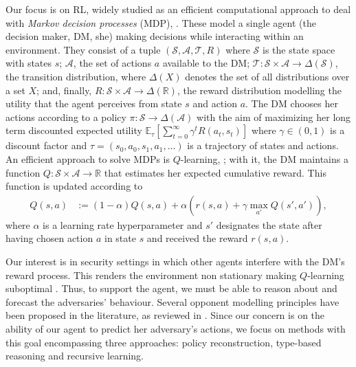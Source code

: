 Our focus is on RL, widely studied as an efficient computational approach to deal with \textit{Markov decision processes} (MDP), \parencite{howard:dp}. These model a single agent (the decision maker, DM, she)
making decisions 
while interacting within an environment.  
They consist of a
tuple $\left( \mathcal{S}, \mathcal{A}, \mathcal{T}, R\right)$
where $\mathcal{S}$ is the state space with states $s$; $\mathcal{A}$,   the set of
actions $a$ available to the DM;
$\mathcal{T}: \mathcal{S} \times \mathcal{A} \rightarrow \Delta (\mathcal{S})$, the transition distribution, where $\Delta(X)$ denotes the set of
all distributions over a set $X$;
and, finally, $R : \mathcal{S} \times \mathcal{A}  \rightarrow \Delta(\mathbb{R}) $, the reward distribution modelling the utility that the agent perceives
from state $s$ and action $a$. 
The DM chooses her actions according to a policy $\pi: \mathcal{S} \rightarrow \Delta(\mathcal{A})$ 
with the aim of maximizing 
her long term discounted expected utility
$ 
 \mathbb{E}_{\tau} \left[  \sum_{t=0}^\infty \gamma^t R(a_t, s_t) \right] 
 $ 
where $\gamma \in (0,1)$ is a discount factor and $\tau = (s_0, a_0, s_1, a_1, \ldots)$ is a trajectory of states and actions.
  An efficient approach to solve MDPs is $Q$-learning, \parencite{sutton2012reinforcement}; with it, the DM maintains a
 function
$Q : \mathcal{S} \times \mathcal{A} \rightarrow \mathbb{R}$ that estimates
her expected cumulative reward. This function is updated according to
\begin{align}\label{eq:ql}
Q(s,a) &:= (1 - \alpha) Q(s, a)  +  \alpha \left(r(s,a) + \gamma\max_{a'} Q(s', a') \right),
\end{align}
where $\alpha$ is a learning rate hyperparameter
and $s'$ designates the state %
after having chosen action $a$ in state $s$ and received the reward $r(s,a)$.

Our interest is in security settings in which other  agents
interfere with the DM's reward process. This renders the environment
non stationary making  $Q$-learning suboptimal \parencite{marl_over}. 
Thus, to support the agent,
we must be able to reason about and forecast the adversaries' behaviour.
Several opponent modelling principles have been proposed in the  literature,
as reviewed in \parencite{Albrecht2018AutonomousAM}. 
Since our concern is on the ability of our agent to predict 
her adversary's actions, we focus on methods
with this goal encompassing three approaches: policy reconstruction, type-based reasoning and recursive learning.

